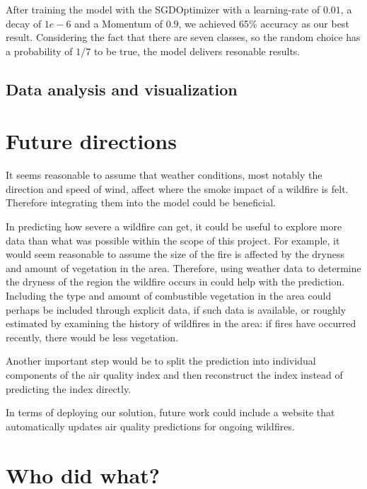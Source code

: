 \documentclass[a4paper,12pt]{article}
\begin{document}
After training the model with the SGDOptimizer with a learning-rate of $0.01$, a decay of $1e-6$ and a Momentum of $0.9$, we achieved 65\% accuracy as our best result.
Considering the fact that there are seven classes, so the random choice has a probability of $1/7$ to be true, the model delivers resonable results.

\subsection{Data analysis and visualization}

\section{Future directions}

It seems reasonable to assume that weather conditions, most notably the direction and speed of wind, affect where the smoke impact of a wildfire is felt. Therefore integrating them into the model could be beneficial.

In predicting how severe a wildfire can get, it could be useful to explore more data than what was possible within the scope of this project. For example, it would seem reasonable to assume the size of the fire is affected by the dryness and amount of vegetation in the area. Therefore, using weather data to determine the dryness of the region the wildfire occurs in could help with the prediction. Including the type and amount of combustible vegetation in the area could perhaps be included through explicit data, if such data is available, or roughly estimated by examining the history of wildfires in the area: if fires have occurred recently, there would be less vegetation.

Another important step would be to split the prediction into individual components of the air quality index and then reconstruct the index instead of predicting the index directly.

In terms of deploying our solution, future work could include a website that automatically updates air quality predictions for ongoing wildfires.

\section{Who did what?}

\nocite{*}
\printbibliography[title={Bibliography},heading=bibliography]
\end{document}
